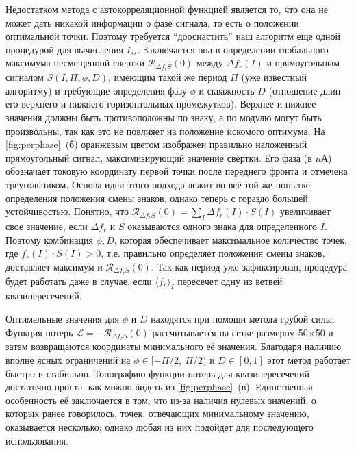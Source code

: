 \documentclass[14pt, a4paper]{extreport}
\numberwithin{equation}{section}
\begin{document}
Недостатком метода с автокорреляционной функцией является то, что она не может дать никакой информации о фазе сигнала, то есть о положении оптимальной точки. Поэтому требуется ``дооснастить'' наш алгоритм еще одной процедурой для вычисления $I_{ss}$. Заключается она в определении глобального максимума несмещенной свертки $\mathcal{R}_{\Delta f_r S}(0)$ между $\Delta f_r(I)$ и прямоугольным сигналом $S(I, \Pi, \phi, D)$, имеющим такой же период $\Pi$ (уже известный алгоритму) и требующие определения фазу $\phi$ и скважность $D$ (отношение длин его верхнего и нижнего горизонтальных промежутков). Верхнее и нижнее значения должны быть противоположны по знаку, а по модулю могут быть произвольны, так как это не повлияет на положение искомого оптимума. На \autoref{fig:perphase}~(б) оранжевым цветом изображен правильно наложенный прямоугольный сигнал, максимизирующий значение свертки. Его фаза (в $\mu$А) обозначает токовую координату первой точки после переднего фронта и отмечена треугольником. Основа идеи этого подхода лежит во всё той же попытке определения положения смены знаков, однако теперь с гораздо большей устойчивостью. Понятно, что $\mathcal{R}_{\Delta f_r S}(0) = \sum_I \Delta f_r(I) \cdot S(I) $ увеличивает свое значение, если $\Delta f_r$ и $S$ оказываются одного знака для определенного $I$. Поэтому комбинация $\phi, D$, которая обеспечивает максимальное количество точек, где $f_r(I)\cdot S(I)>0$, т.е. правильно определяет положения смены знаков, доставляет максимум и $\mathcal{R}_{\Delta f_r S}(0)$. Так как период уже зафиксирован, процедура будет работать даже в случае, если $\langle f_r \rangle_{I}$ пересечет одну из ветвей квазипересечений.

Оптимальные значения для $\phi$ и $D$ находятся при помощи метода грубой силы. Функция потерь $\mathcal{L} = - \mathcal{R}_{\Delta f_r S}(0)$ рассчитывается на сетке размером 50$\times$50 и затем возвращаются координаты минимального её значения. Благодаря наличию вполне ясных ограничений на $\phi \in [-\Pi/2,\ \Pi/2)$ и $D\in [0,1]$ этот метод работает быстро и стабильно. Топографию функции потерь для квазипересечений достаточно проста, как можно видеть из \autoref{fig:perphase}~(в). Единственная особенность её заключается в том, что из-за наличия нулевых значений, о которых ранее говорилось, точек, отвечающих минимальному значению, оказывается несколько; однако любая из них подойдет для последующего использования.
\end{document}
